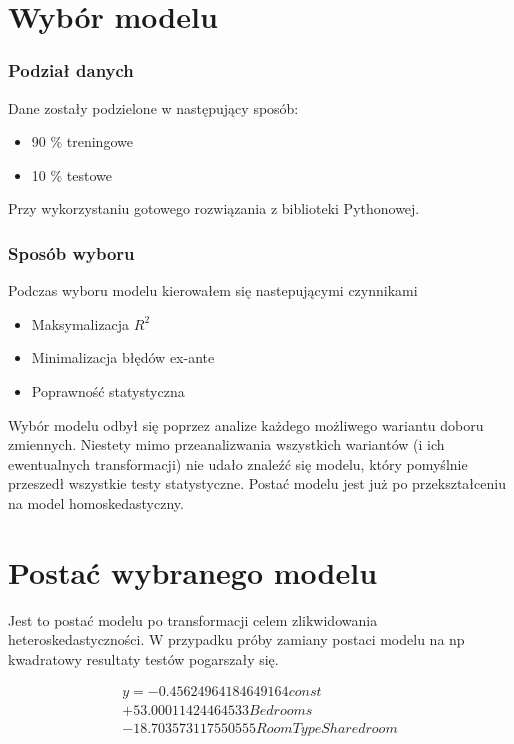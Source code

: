 \section{Wybór modelu}\label{sec:wybrany-modelu}

\subsubsection{Podział danych}

Dane zostały podzielone w następujący sposób:

\begin{itemize}
    \item 90 \% treningowe
    \item 10 \% testowe
\end{itemize}

Przy wykorzystaniu gotowego rozwiązania z biblioteki Pythonowej.

\subsubsection{Sposób wyboru}

Podczas wyboru modelu kierowałem się nastepującymi czynnikami

\begin{itemize}
    \item Maksymalizacja \(R^{2}\)
    \item Minimalizacja błędów ex-ante
    \item Poprawność statystyczna
\end{itemize}

Wybór modelu odbył się poprzez analize każdego możliwego wariantu doboru zmiennych.
Niestety mimo przeanalizwania wszystkich wariantów (i ich ewentualnych transformacji) nie udało znaleźć się modelu, który pomyślnie przeszedł wszystkie testy statystyczne.
Postać modelu jest już po przekształceniu na model homoskedastyczny.


\section{Postać wybranego modelu}\label{sec:postac-modelu}
Jest to postać modelu po transformacji celem zlikwidowania heteroskedastyczności.
W przypadku próby zamiany postaci modelu na np kwadratowy resultaty testów pogarszały się.

\begin{equation}
    \begin{split}
        y=-0.45624964184649164const \\ + 53.00011424464533Bedrooms \\ - 18.703573117550555RoomTypeShared room
    \end{split}
\end{equation}

